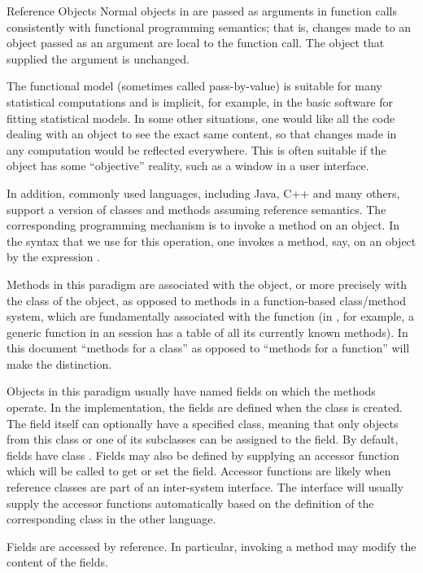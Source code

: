 \begin{Section}{Reference Objects}
Normal objects in \R{} are passed as arguments in function calls consistently with
functional programming semantics; that is, changes made to an object
passed as an argument are local to the function call.  The object that
supplied the argument is unchanged.

The functional model (sometimes called pass-by-value) is
suitable for many statistical computations and is implicit, for
example, in the basic \R{} software for fitting statistical models.
In some other situations, one would like all the code dealing with an
object to see the exact same content, so that changes made in any
computation would be reflected everywhere.
This is often suitable if the object has some ``objective''
reality, such as a window in a user interface.

In addition, commonly used languages, including Java, C++ and many
others, support a version of classes and methods assuming reference
semantics.
The corresponding programming mechanism
is to invoke a method on an object.
In the \R{} syntax that we use for this operation, one invokes a method,
 say, on an object  by the expression
. 

Methods in this paradigm are associated with the object, or more
precisely with the class of the object, as opposed to methods in a
function-based class/method system, which are fundamentally associated
with the function (in \R{}, for example, a generic function in an \R{}
session has a table of all its currently known methods).
In this document ``methods for a class'' as opposed to
``methods for a function'' will make the distinction.

Objects in this paradigm usually have named fields on which
the methods operate.
In the \R{} implementation, the fields are defined when the class is
created.
The field itself can optionally have a specified class, meaning that only objects
from this class or one of its subclasses can be assigned to the field.
By default, fields have class .
Fields may also be defined by supplying an accessor function which
will be called to get or set the field.
Accessor functions are likely when reference classes are part of an
inter-system interface.
The interface will usually supply the accessor functions automatically
based on the definition of the corresponding class in the other language.

Fields are accessed by reference.
In particular, invoking a method may modify the content of
the fields.


\end{Section}
